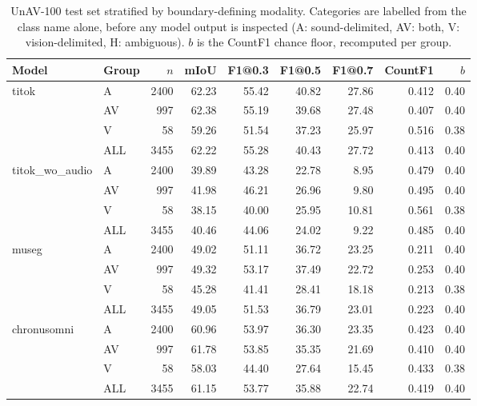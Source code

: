 \begin{table}[t]
\centering\small
\caption{UnAV-100 test set stratified by boundary-defining modality. Categories are labelled from the class name alone, before any model output is inspected (A: sound-delimited, AV: both, V: vision-delimited, H: ambiguous). $b$ is the CountF1 chance floor, recomputed per group.}
\label{tab:modality_breakdown}
\begin{tabular}{llrrrrrrr}
\toprule
Model & Group & $n$ & mIoU & F1@0.3 & F1@0.5 & F1@0.7 & CountF1 & $b$ \\
\midrule
titok & A & 2400 & 62.23 & 55.42 & 40.82 & 27.86 & 0.412 & 0.40 \\
 & AV & 997 & 62.38 & 55.19 & 39.68 & 27.48 & 0.407 & 0.40 \\
 & V & 58 & 59.26 & 51.54 & 37.23 & 25.97 & 0.516 & 0.38 \\
 & ALL & 3455 & 62.22 & 55.28 & 40.43 & 27.72 & 0.413 & 0.40 \\
\midrule
titok\_wo\_audio & A & 2400 & 39.89 & 43.28 & 22.78 & 8.95 & 0.479 & 0.40 \\
 & AV & 997 & 41.98 & 46.21 & 26.96 & 9.80 & 0.495 & 0.40 \\
 & V & 58 & 38.15 & 40.00 & 25.95 & 10.81 & 0.561 & 0.38 \\
 & ALL & 3455 & 40.46 & 44.06 & 24.02 & 9.22 & 0.485 & 0.40 \\
\midrule
museg & A & 2400 & 49.02 & 51.11 & 36.72 & 23.25 & 0.211 & 0.40 \\
 & AV & 997 & 49.32 & 53.17 & 37.49 & 22.72 & 0.253 & 0.40 \\
 & V & 58 & 45.28 & 41.41 & 28.41 & 18.18 & 0.213 & 0.38 \\
 & ALL & 3455 & 49.05 & 51.53 & 36.79 & 23.01 & 0.223 & 0.40 \\
\midrule
chronusomni & A & 2400 & 60.96 & 53.97 & 36.30 & 23.35 & 0.423 & 0.40 \\
 & AV & 997 & 61.78 & 53.85 & 35.35 & 21.69 & 0.410 & 0.40 \\
 & V & 58 & 58.03 & 44.40 & 27.64 & 15.45 & 0.433 & 0.38 \\
 & ALL & 3455 & 61.15 & 53.77 & 35.88 & 22.74 & 0.419 & 0.40 \\
\bottomrule
\end{tabular}
\end{table}

